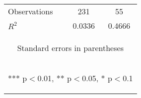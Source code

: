 \begin{center}
\begin{tabular}{lcc}
Observations & 231 & 55 \\
 $R^2$ & 0.0336 & 0.4666 \\ \hline
\multicolumn{3}{c}{\begin{footnotesize} Standard errors in parentheses\end{footnotesize}} \\
\multicolumn{3}{c}{\begin{footnotesize} *** p$<$0.01, ** p$<$0.05, * p$<$0.1\end{footnotesize}} \\
\end{tabular}
\end{center}
